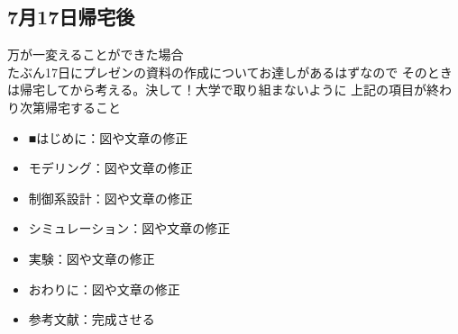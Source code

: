  \subsection{7月17日帰宅後}
 万が一変えることができた場合\\
 たぶん17日にプレゼンの資料の作成についてお達しがあるはずなので
 そのときは帰宅してから考える。決して！大学で取り組まないように
 上記の項目が終わり次第帰宅すること
 \begin{itemize}
   \item ■はじめに：図や文章の修正
   \item モデリング：図や文章の修正
   \item 制御系設計：図や文章の修正
   \item シミュレーション：図や文章の修正
   \item 実験：図や文章の修正
   \item おわりに：図や文章の修正
   \item 参考文献：完成させる
 \end{itemize}
